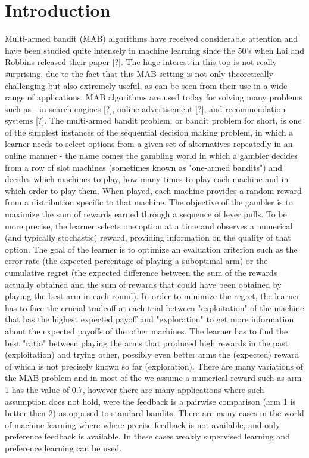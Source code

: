\documentclass{llncs}
\begin{document}
\section{Introduction}
	Multi-armed bandit (MAB) algorithms have received considerable attention and have been studied quite intensely in machine learning since the 50's when  Lai and Robbins released their paper [?]. 
	The huge interest in this top is not really surprising, due to the fact that this MAB setting is not only theoretically challenging but also extremely useful, as can be seen from their use in a wide range of applications. MAB algorithms are used today for solving many problems such as - in search engines [?], online advertisement [?], and recommendation systems [?].
	The multi-armed bandit problem, or bandit problem for short, is one of the simplest instances of the sequential decision making problem, in which a learner needs to select options from a given set of alternatives repeatedly in an online manner -  the name comes the gambling world in which a gambler decides from a row of slot machines (sometimes known as "one-armed bandits") and decides which machines to play, how many times to play each machine and in which order to play them. When played, each machine provides a random reward from a distribution specific to that machine. 
	The objective of the gambler is to maximize the sum of rewards earned through a sequence of lever pulls. 
	To be more precise, the learner selects one option at a time and observes a numerical (and typically stochastic) reward, providing information on the quality of that option. The goal of the learner is to optimize an evaluation criterion such as the error rate (the expected percentage of playing a suboptimal arm) or the cumulative regret (the expected difference between the sum of the rewards actually obtained and the sum of rewards that could have been obtained by playing the best arm in each round).
	In order to minimize the regret, the learner has to face the crucial tradeoff at each trial between "exploitation" of the machine that has the highest expected payoff and "exploration" to get more information about the expected payoffs of the other machines. 
	The learner has to find the best "ratio" between playing the arms that produced high rewards in the past (exploitation) and trying other, possibly even better arms the (expected) reward of which is not precisely known so far (exploration).
	There are many variations of the MAB problem and in most of the we assume a numerical reward such as arm 1 has the value of 0.7, however there are many applications where such assumption does not hold,  were the feedback is a pairwise comparison (arm 1 is better then 2) as opposed to standard bandits.
	There are many cases in the world of machine learning where where precise feedback is not available, and only preference feedback is available. In these cases weakly supervised learning and preference learning can be used.  	
	 
\end{document}
